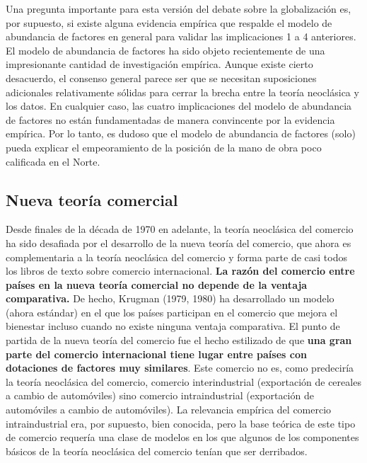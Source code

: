 Una pregunta importante para esta versión del debate sobre la globalización es, por supuesto, si existe alguna evidencia empírica que respalde el modelo de abundancia de factores en general para validar las implicaciones 1 a 4 anteriores. El modelo de abundancia de factores ha sido objeto recientemente de una impresionante cantidad de investigación empírica.  Aunque existe cierto desacuerdo, el consenso general parece ser que se necesitan suposiciones adicionales relativamente sólidas para cerrar la brecha entre la teoría neoclásica y los datos. En cualquier caso, las cuatro implicaciones del modelo de abundancia de factores no están fundamentadas de manera convincente por la evidencia empírica. Por lo tanto, es dudoso que el modelo de abundancia de factores (solo) pueda explicar el empeoramiento de la posición de la mano de obra poco calificada en el Norte.

\subsection{Nueva teoría comercial}
Desde finales de la década de 1970 en adelante, la teoría neoclásica del comercio ha sido desafiada por el desarrollo de la nueva teoría del comercio, que ahora es complementaria a la teoría neoclásica del comercio y forma parte de casi todos los libros de texto sobre comercio internacional. \textbf{La razón del comercio entre países en la nueva teoría comercial no depende de la ventaja comparativa.} De hecho, Krugman (1979, 1980) ha desarrollado un modelo (ahora estándar) en el que los países participan en el comercio que mejora el bienestar incluso cuando no existe ninguna ventaja comparativa. El punto de partida de la nueva teoría del comercio fue el hecho estilizado de que \textbf{una gran parte del comercio internacional tiene lugar entre países con dotaciones de factores muy similares}. Este comercio no es, como predeciría la teoría neoclásica del comercio, comercio interindustrial (exportación de cereales a cambio de automóviles) sino comercio intraindustrial (exportación de automóviles a cambio de automóviles). La relevancia empírica del comercio intraindustrial era, por supuesto, bien conocida, pero la base teórica de este tipo de comercio requería una clase de modelos en los que algunos de los componentes básicos de la teoría neoclásica del comercio tenían que ser derribados.

